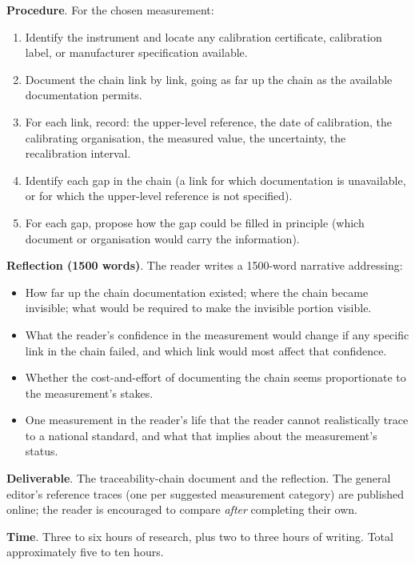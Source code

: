 \begin{project}
\textbf{Procedure}. For the chosen measurement:

\begin{enumerate}[leftmargin=*]
  \item Identify the instrument and locate any calibration
    certificate, calibration label, or manufacturer specification
    available.
  \item Document the chain link by link, going as far up the chain
    as the available documentation permits.
  \item For each link, record: the upper-level reference, the date
    of calibration, the calibrating organisation, the measured
    value, the uncertainty, the recalibration interval.
  \item Identify each gap in the chain (a link for which
    documentation is unavailable, or for which the upper-level
    reference is not specified).
  \item For each gap, propose how the gap could be filled in
    principle (which document or organisation would carry the
    information).
\end{enumerate}

\textbf{Reflection (1500 words)}. The reader writes a 1500-word
narrative addressing:

\begin{itemize}[leftmargin=*]
  \item How far up the chain documentation existed; where the
    chain became invisible; what would be required to make the
    invisible portion visible.
  \item What the reader's confidence in the measurement would
    change if any specific link in the chain failed, and which link
    would most affect that confidence.
  \item Whether the cost-and-effort of documenting the chain seems
    proportionate to the measurement's stakes.
  \item One measurement in the reader's life that the reader cannot
    realistically trace to a national standard, and what that
    implies about the measurement's status.
\end{itemize}

\textbf{Deliverable}. The traceability-chain document and the
reflection. The general editor's reference traces (one per
suggested measurement category) are published online; the reader is
encouraged to compare \emph{after} completing their own.

\textbf{Time}. Three to six hours of research, plus two to three
hours of writing. Total approximately five to ten hours.
\end{project}

